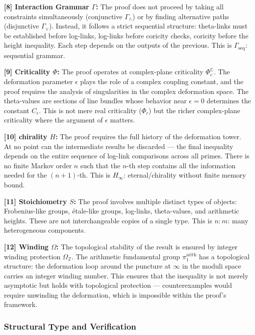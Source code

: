 \documentclass[12pt,a4paper]{article}
\begin{document}
\textbf{{[}8{]} Interaction Grammar $\Gamma$:} The proof does not proceed by taking all constraints simultaneously (conjunctive $\Gamma_{\wedge}$) or by finding alternative paths (disjunctive $\Gamma_{\vee}$). Instead, it follows a strict sequential structure: theta-links must be established before log-links, log-links before coricity checks, coricity before the height inequality. Each step depends on the outputs of the previous. This is $\Gamma_\text{seq}$: sequential grammar.

\textbf{{[}9{]} Criticality $\Phi$:} The proof operates at complex-plane criticality $\Phi_c^\mathbb{C}$. The deformation parameter $\epsilon$ plays the role of a complex coupling constant, and the proof requires the analysis of singularities in the complex deformation space. The theta-values are sections of line bundles whose behavior near $\epsilon = 0$ determines the constant $C_{\epsilon}$. This is not mere real criticality ($\Phi_c$) but the richer complex-plane criticality where the argument of $\epsilon$ matters.

\textbf{{[}10{]} chirality $H$:} The proof requires the full history of the deformation tower. At no point can the intermediate results be discarded --- the final inequality depends on the entire sequence of log-link comparisons across all primes. There is no finite Markov order $n$ such that the $n$-th step contains all the information needed for the $(n+1)$-th. This is $H_{\infty}$: eternal/chirality without finite memory bound.

\textbf{{[}11{]} Stoichiometry $S$:} The proof involves multiple distinct types of objects: Frobenius-like groups, étale-like groups, log-links, theta-values, and arithmetic heights. These are not interchangeable copies of a single type. This is $n{:}m$: many heterogeneous components.

\textbf{{[}12{]} Winding $\Omega$:} The topological stability of the result is ensured by integer winding protection $\Omega_\mathbb{Z}$. The arithmetic fundamental group $\pi_1^{\text{arith}}$ has a topological structure: the deformation loop around the puncture at $\infty$ in the moduli space carries an integer winding number. This ensures that the inequality is not merely asymptotic but holds with topological protection --- counterexamples would require unwinding the deformation, which is impossible within the proof's framework.

\subsubsection{Structural Type and Verification}
\end{document}
